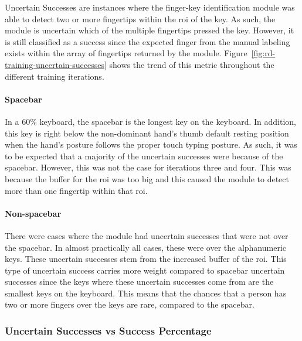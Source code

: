 \documentclass{report}
\begin{document}
Uncertain Successes are instances where the finger-key identification module was
able to detect two or more fingertips within the \ac{roi} of the key. As such,
the module is uncertain which of the multiple fingertips pressed the key.
However, it is still classified as a success since the expected finger from the
manual labeling exists within the array of fingertips returned by the module.
Figure~\ref{fig:rd-training-uncertain-successes} shows the trend of this metric
throughout the different training iterations.

\paragraph{Spacebar}
In a 60\% keyboard, the spacebar is the longest key on the keyboard. In
addition, this key is right below the non-dominant hand's thumb default resting
position when the hand's posture follows the proper touch typing posture. As
such, it was to be expected that a majority of the uncertain successes were
because of the spacebar. However, this was not the case for iterations three and
four. This was because the buffer for the \ac{roi} was too big and this caused
the module to detect more than one fingertip within that \ac{roi}.

\paragraph{Non-spacebar}
There were cases where the module had uncertain successes that were not over the
spacebar. In almost practically all cases, these were over the alphanumeric
keys. These uncertain successes stem from the increased buffer of the \ac{roi}.
This type of uncertain success carries more weight compared to spacebar
uncertain successes since the keys where these uncertain successes come from are
the smallest keys on the keyboard. This means that the chances that a person has
two or more fingers over the keys are rare, compared to the spacebar.


\subsubsection{Uncertain Successes vs Success Percentage}
\label{section:rd-uncertain vs success}
\end{document}
